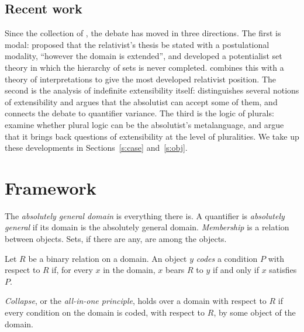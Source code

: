 \documentclass{situationist-preprint}
\begin{document}
\subsection{Recent work}

Since the collection of \citet{RayoUzquiano2006}, the debate has moved in three directions. The first is modal: \citet{Fine2006} proposed that the relativist's thesis be stated with a postulational modality, \enquote{however the domain is extended}, and \citet{Linnebo2010,Linnebo2013} developed a potentialist set theory in which the hierarchy of sets is never completed. \citet{Studd2019} combines this with a theory of interpretations to give the most developed relativist position. The second is the analysis of indefinite extensibility itself: \citet{Uzquiano2015} distinguishes several notions of extensibility and argues that the absolutist can accept some of them, and \citet{Warren2017} connects the debate to quantifier variance. The third is the logic of plurals: \citet{FlorioLinnebo2021} examine whether plural logic can be the absolutist's metalanguage, and argue that it brings back questions of extensibility at the level of pluralities. We take up these developments in Sections~\ref{s:case} and~\ref{s:obj}.

\section{Framework}\label{s:frame}

\begin{definition}\label{d:domain}
The \emph{absolutely general domain} is everything there is. A quantifier is \emph{absolutely general} if its domain is the absolutely general domain. \emph{Membership} is a relation between objects. Sets, if there are any, are among the objects.
\end{definition}

\begin{definition}\label{d:codes}
Let $R$ be a binary relation on a domain. An object $y$ \emph{codes} a condition $P$ with respect to $R$ if, for every $x$ in the domain, $x$ bears $R$ to $y$ if and only if $x$ satisfies $P$.
\end{definition}

\begin{definition}\label{d:collapse}
\emph{Collapse}, or the \emph{all-in-one principle}, holds over a domain with respect to $R$ if every condition on the domain is coded, with respect to $R$, by some object of the domain.
\end{definition}
\end{document}
